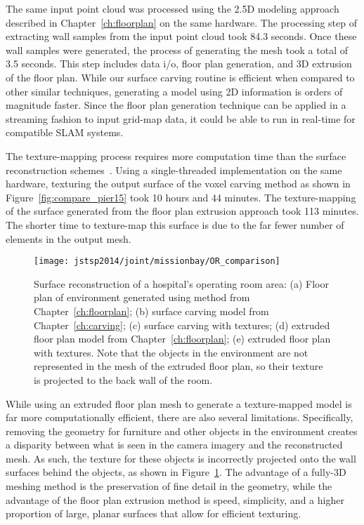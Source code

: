 \documentclass[12pt,onecolumn,oneside]{book}
\begin{document}
The same input point cloud was processed using the 2.5D modeling approach described in Chapter~\ref{ch:floorplan} on the same hardware.  The processing step of extracting wall samples from the input point cloud took 84.3 seconds.  Once these wall samples were generated, the process of generating the mesh took a total of 3.5 seconds.  This step includes data i/o, floor plan generation, and 3D extrusion of the floor plan.  While our surface carving routine is efficient when compared to other similar techniques, generating a model using 2D information is orders of magnitude faster.  Since the floor plan generation technique can be applied in a streaming fashion to input grid-map data, it could be able to run in real-time for compatible SLAM systems.

The texture-mapping process requires more computation time than the surface reconstruction schemes~\cite{Cheng13,Cheng14}.  Using a single-threaded implementation on the same hardware, texturing the output surface of the voxel carving method as shown in Figure~\ref{fig:compare_pier15} took 10 hours and 44 minutes.  The texture-mapping of the surface generated from the floor plan extrusion approach took 113 minutes. The shorter time to texture-map this surface is due to the far fewer number of elements in the output mesh.

\begin{figure}[t]
	\centerline{\texttt{[image: jstsp2014/joint/missionbay/OR\_comparison]}}
	\caption[Comparison of surface reconstruction methods for hospital operating rooms.]{Surface reconstruction of a hospital's operating room area:  (a) Floor plan of environment generated using method from Chapter~\ref{ch:floorplan}; (b) surface carving model from Chapter~\ref{ch:carving}; (c) surface carving with textures; (d) extruded floor plan model from Chapter~\ref{ch:floorplan}; (e) extruded floor plan with textures.  Note that the objects in the environment are not represented in the mesh of the extruded floor plan, so their texture is projected to the back wall of the room.}
	\label{fig:comparison_missionbay}
\end{figure}

While using an extruded floor plan mesh to generate a texture-mapped model is far more computationally efficient, there are also several limitations.  Specifically, removing the geometry for furniture and other objects in the environment creates a disparity between what is seen in the camera imagery and the reconstructed mesh.  As such, the texture for these objects is incorrectly projected onto the wall surfaces behind the objects, as shown in Figure~\ref{fig:comparison_missionbay}.  The advantage of a fully-3D meshing method is the preservation of fine detail in the geometry, while the advantage of the floor plan extrusion method is speed, simplicity, and a higher proportion of large, planar surfaces that allow for efficient texturing.
\end{document}

